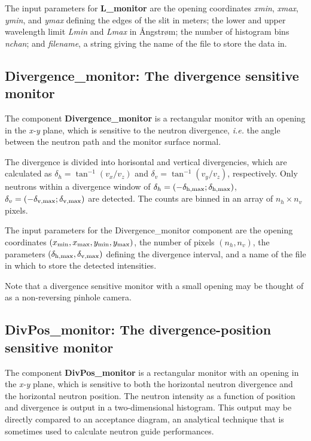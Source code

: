 The input parameters for {\bf L\_monitor} are the opening
coordinates \textit{xmin}, \textit{xmax}, \textit{ymin}, and
\textit{ymax} defining the edges of the slit in meters;
the lower and upper wavelength limit \textit{Lmin} and
\textit{Lmax} in {\AA}ngstr{\o}m; the number of histogram bins
\textit{nchan}; and \textit{filename}, a
string giving the name of the file to store the data in.


\subsection{Divergence\_monitor: The divergence sensitive monitor}

The component {\bf Divergence\_monitor} is a rectangular monitor
with an opening in the \textit{x-y} plane,
which is sensitive to the neutron divergence, {\em i.e.} the angle
between the neutron path and the monitor surface normal.
 
The divergence is divided into horisontal and vertical divergencies,
which are calculated as $\delta_h = \tan^{-1}(v_x/v_z)$ 
and $\delta_v = \tan^{-1}(v_y/v_z)$, respectively. 
Only neutrons within a divergence window of 
$\delta_h = (-\delta_{\rm h,max} ; \delta_{\rm h,max})$, 
$\delta_v = (-\delta_{\rm v,max} ; \delta_{\rm v,max})$ 
are detected. The counts are binned in an array of $n_h \times n_v$ pixels.

The input parameters for the Divergence\_monitor component are the opening coordinates
$(x_{\rm min}, x_{\rm max}, y_{\rm min}, y_{\rm max})$, 
the number of pixels $(n_h, n_v)$, 
the parameters $(\delta_{\rm h,max}, \delta_{\rm v,max})$ 
defining the divergence interval,
and a name of the file in which to store the detected intensities.

Note that a divergence sensitive monitor with a small opening may be 
thought of as a non-reversing pinhole camera.


\subsection{DivPos\_monitor: The divergence-position sensitive monitor}

The component {\bf DivPos\_monitor} is a rectangular monitor with an
opening in the \textit{x-y} plane, which is sensitive to both the
horizontal neutron divergence and the horizontal neutron position. The
neutron intensity as a function of position and divergence is output in
a two-dimensional histogram. This output may be directly compared to an
acceptance diagram, an analytical technique that is sometimes used to
calculate neutron guide performances.
 
